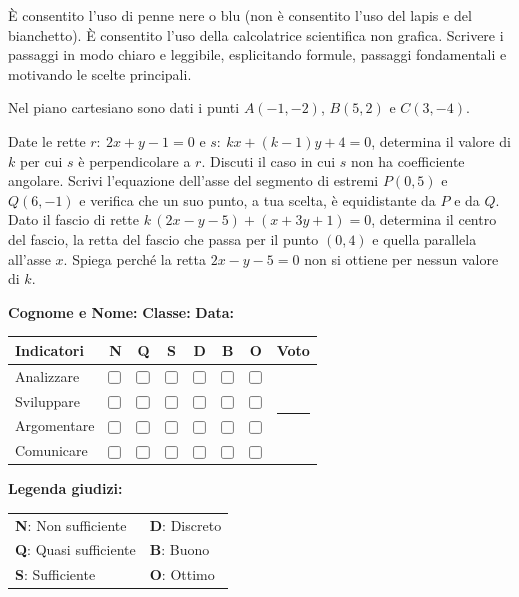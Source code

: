 \documentclass[a4paper,10pt]{exam}
\makeatletter
\newcommand{\cbox}{\ensuremath{\vcenter{\hbox{\tikz{\draw[black!75, line width=0.5pt, rounded corners=1.2pt] (0,0) rectangle (3.0mm, 3.0mm);}}}}}
\newcommand{\grigliacompetenze}{
\vspace{1mm}
\noindent
\begin{minipage}[c]{0.62\linewidth}
\footnotesize
\setlength{\aboverulesep}{0pt}
\setlength{\belowrulesep}{0pt}
\renewcommand{\arraystretch}{1.25}
\begin{tabular}{l cc >{\columncolor{gray!20}}c ccc c}
\toprule
\rowcolor{gray!10}
\textbf{Indicatori} & \textbf{N} & \textbf{Q} & \cellcolor{gray!20}\textbf{S} & \textbf{D} & \textbf{B} & \textbf{O} & \textbf{Voto} \\
\midrule
Analizzare    & \cbox & \cbox & \cbox & \cbox & \cbox & \cbox & \multirow{4}{*}{\rule{1.4cm}{0pt}} \\
Sviluppare    & \cbox & \cbox & \cbox & \cbox & \cbox & \cbox & \\
Argomentare   & \cbox & \cbox & \cbox & \cbox & \cbox & \cbox & \\
Comunicare    & \cbox & \cbox & \cbox & \cbox & \cbox & \cbox & \\
\bottomrule
\end{tabular}
\end{minipage}\hfill
\begin{minipage}[c]{0.35\linewidth}
\scriptsize \color{black!75}
\textbf{Legenda giudizi:}\par\vspace{1mm}
\begin{tabular}{@{}ll@{}}
\textbf{N}: Non sufficiente & \textbf{D}: Discreto \\
\textbf{Q}: Quasi sufficiente & \textbf{B}: Buono \\
\textbf{S}: Sufficiente & \textbf{O}: Ottimo \\
\end{tabular}
\end{minipage}
}
\makeatother
\begin{document}
\begin{tcolorbox}[istruzionibox]
È consentito l'uso di penne nere o blu (non è consentito l'uso del lapis e del bianchetto).
È consentito l'uso della calcolatrice scientifica non grafica.
Scrivere i passaggi in modo chiaro e leggibile, esplicitando formule, passaggi fondamentali e motivando le scelte principali.
\end{tcolorbox}

\vspace{1.5mm}


\begin{questions}
\question Nel piano cartesiano sono dati i punti $A(-1,-2)$, $B(5,2)$ e $C(3,-4)$.
\question Date le rette $r:\ 2x+y-1=0$ e $s:\ kx+(k-1)y+4=0$, determina il valore di $k$ per cui $s$ è perpendicolare a $r$. Discuti il caso in cui $s$ non ha coefficiente angolare.
\question Scrivi l'equazione dell'asse del segmento di estremi $P(0,5)$ e $Q(6,-1)$ e verifica che un suo punto, a tua scelta, è equidistante da $P$ e da $Q$.
\question Dato il fascio di rette $k\,(2x-y-5)+(x+3y+1)=0$, determina il centro del fascio, la retta del fascio che passa per il punto $(0,4)$ e quella parallela all'asse $x$. Spiega perché la retta $2x-y-5=0$ non si ottiene per nessun valore di $k$.
\end{questions}
\null
\vfill

\noindent
\textbf{Cognome e Nome:}\enspace\hrulefill\hspace{1cm}%
\textbf{Classe:}\enspace\makebox[2.5cm]{\hrulefill}\hspace{1cm}%
\textbf{Data:}\enspace\makebox[2.5cm]{\hrulefill}

\vspace{3mm}
\grigliacompetenze
\end{document}
